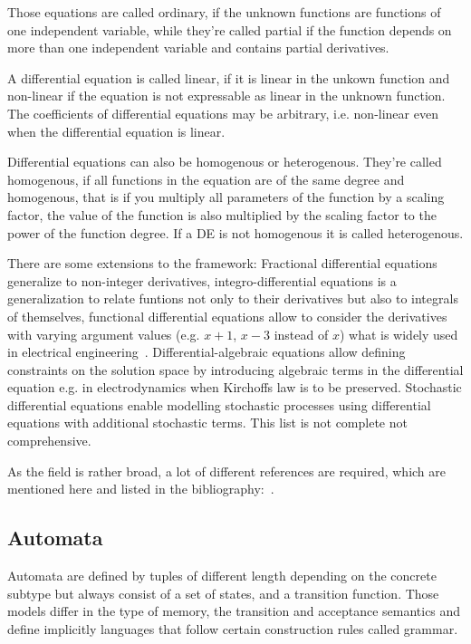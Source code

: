 \documentclass[11pt, rgb]{scrartcl}
\begin{document}
Those equations are called ordinary, if the unknown functions are functions of one independent variable, while they're called partial if the function depends on more than one independent variable and contains partial derivatives. 

A differential equation is called linear, if it is linear in the unkown function and non-linear if the equation is not expressable as linear in the unknown function. 
The coefficients of differential equations may be arbitrary, i.e. non-linear even when the differential equation is linear. 

Differential equations can also be homogenous or heterogenous. 
They're called homogenous, if all functions in the equation are of the same degree and homogenous, that is if you multiply all parameters of the function by a scaling factor, the value of the function is also multiplied by the scaling factor to the power of the function degree. 
If a DE is not homogenous it is called heterogenous. 

There are some extensions to the framework: 
Fractional differential equations generalize to non-integer derivatives, integro-differential equations is a generalization to relate funtions not only to their derivatives but also to integrals of themselves, functional differential equations allow to consider the derivatives with varying argument values (e.g. $x+1$, $x-3$ instead of $x$) what is widely used in electrical engineering~\autocite{richard}.
Differential-algebraic equations allow defining constraints on the solution space by introducing algebraic terms in the differential equation e.g. in electrodynamics when Kirchoffs law is to be preserved. 
Stochastic differential equations enable modelling stochastic processes using differential equations with additional stochastic terms. This list is not complete not comprehensive.

As the field is rather broad, a lot of different references are required, which are mentioned here and listed in the bibliography:~\autocite{dae, ode_dae, dtsp, fde, handbook_de, ide, nlc, simmons_de, sde}. 


\subsection{Automata} 
Automata are defined by tuples of different length depending on the concrete subtype but always consist of a set of states, and a transition function. 
Those models differ in the type of memory, the transition and acceptance semantics and define implicitly languages that follow certain construction rules called grammar. 
\end{document}
